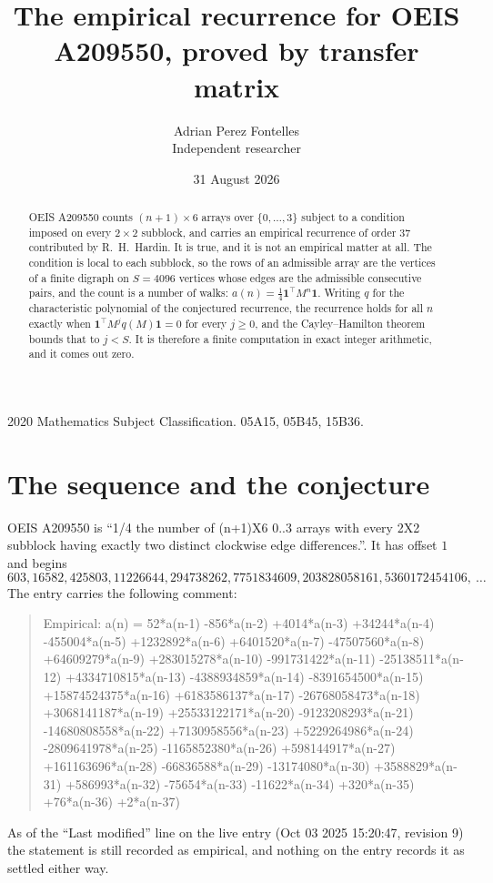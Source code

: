 \documentclass[11pt,a4paper]{article}
\title{The empirical recurrence for OEIS A209550, proved by transfer matrix}
\author{Adrian Perez Fontelles\\ \small Independent researcher}
\date{31 August 2026}
\theoremstyle{plain}
\theoremstyle{definition}
\begin{document}
\maketitle

\begin{abstract}
OEIS A209550 counts $(n+1)\times6$ arrays over $\{0,\dots,3\}$ subject to a condition imposed on
every $2\times2$ subblock, and carries an empirical recurrence of order $37$ contributed
by R.~H.~Hardin. It is true, and it is not an empirical matter at all. The condition is local
to each subblock, so the rows of an admissible array are the vertices of a finite digraph
on $S=4096$ vertices whose edges are the admissible consecutive pairs, and the count is a
number of walks: $a(n)=\tfrac1{4}\mathbf{1}^{\!\top}M^{n}\mathbf{1}$. Writing $q$
for the characteristic polynomial of the conjectured recurrence, the recurrence holds for all
$n$ exactly when $\mathbf{1}^{\!\top}M^{j}q(M)\mathbf{1}=0$ for every $j\ge0$, and the
Cayley--Hamilton theorem bounds that to $j<S$. It is therefore a finite computation in exact
integer arithmetic, and it comes out zero.
\end{abstract}

\noindent\small 2020 Mathematics Subject Classification. 05A15, 05B45, 15B36.\normalsize

\section{The sequence and the conjecture}

OEIS A209550 is ``1/4 the number of (n+1)X6 0..3 arrays with every 2X2 subblock having exactly two distinct clockwise edge differences.''. It has offset $1$ and begins
\[
603, 16582, 425803, 11226644, 294738262, 7751834609, 203828058161, 5360172454106,\ \dots
\]
The entry carries the following comment:
\begin{quote}\small
Empirical: a(n) = 52*a(n-1) -856*a(n-2) +4014*a(n-3) +34244*a(n-4) -455004*a(n-5) +1232892*a(n-6) +6401520*a(n-7) -47507560*a(n-8) +64609279*a(n-9) +283015278*a(n-10) -991731422*a(n-11) -25138511*a(n-12) +4334710815*a(n-13) -4388934859*a(n-14) -8391654500*a(n-15) +15874524375*a(n-16) +6183586137*a(n-17) -26768058473*a(n-18) +3068141187*a(n-19) +25533122171*a(n-20) -9123208293*a(n-21) -14680808558*a(n-22) +7130958556*a(n-23) +5229264986*a(n-24) -2809641978*a(n-25) -1165852380*a(n-26) +598144917*a(n-27) +161163696*a(n-28) -66836588*a(n-29) -13174080*a(n-30) +3588829*a(n-31) +586993*a(n-32) -75654*a(n-33) -11622*a(n-34) +320*a(n-35) +76*a(n-36) +2*a(n-37)
\end{quote}
As of the ``Last modified'' line on the live entry (Oct 03 2025 15:20:47, revision 9) the statement is
still recorded as empirical, and nothing on the entry records it as settled either way.
\end{document}
